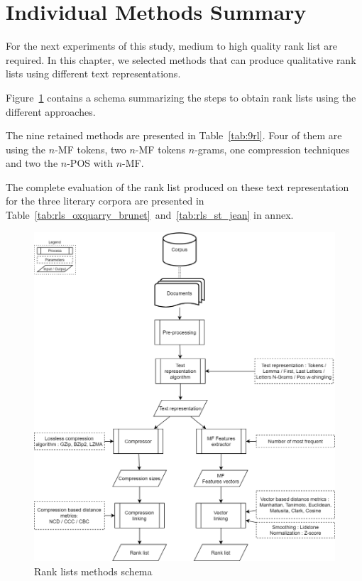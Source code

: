 \section{Individual Methods Summary \label{sec:individual_methods_summary}}

For the next experiments of this study, medium to high quality rank list are required.
In this chapter, we selected methods that can produce qualitative rank lists using different text representations.

Figure~\ref{fig:schema-rank_lists} contains a schema summarizing the steps to obtain rank lists using the different approaches.

The nine retained methods are presented in Table~\ref{tab:9rl}.
Four of them are using the $n$-MF tokens, two $n$-MF tokens $n$-grams, one compression techniques and two the $n$-POS with $n$-MF.

The complete evaluation of the rank list produced on these text representation for the three literary corpora are presented in Table~\ref{tab:rls_oxquarry_brunet}~and~\ref{tab:rls_st_jean} in annex.

\begin{figure}
  \centering
  \caption{Rank lists methods schema}
  \label{fig:schema-rank_lists}
  \includegraphics[width=0.90\linewidth]{img/schema-rank_lists.png}
\end{figure}

